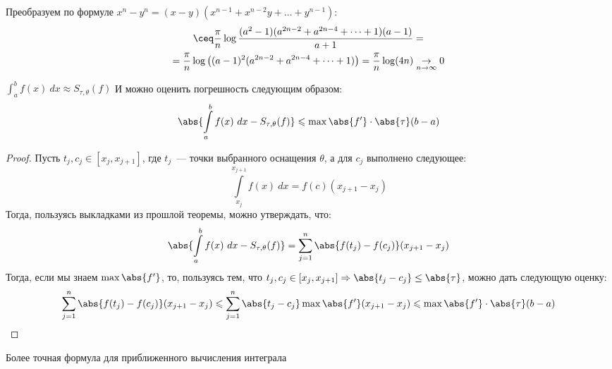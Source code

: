 \begin{example}
\begin{enumerate}
\begin{itemize}
\[            \] 
            Преобразуем по формуле $x^n - y^n = (x - y)(x^{n - 1} + x^{n - 2}y + \dots + y^{n - 1})$:
            \[
                \begin{gathered}
                    \ceq \frac{\pi}{n}\log\frac{(a^2-1)(a^{2n - 2}+a^{2n - 4} + \dots + 1)(a-1)}{a+1}=\\=
                    \frac{\pi}{n}\log\left((a-1)^2(a^{2n - 2}+a^{2n - 4} + \dots + 1)\right) = \frac{\pi}{n}\log(4n)
                    \underset{n\to\infty}{\to} 0
                \end{gathered}
            \] 
    \end{itemize}
    \end{enumerate}
    
\end{example}


\begin{remark}
    $\int_a^b f(x)\ dx \approx S_{\tau, \theta}(f)$
    И можно оценить погрешность следующим образом:
     \[
        \abs{\int\limits_{a}^{b}{f(x)\ dx} - S_{\tau, \theta}(f)} \leqslant \max{\abs{f'}} \cdot \abs{\tau} (b - a) 
    \] 
\end{remark}
\begin{proof}
    Пусть $t_j, c_j \in [x_j, x_{j + 1}]$, где $t_j$~--- точки выбранного оснащения $\theta$, а для $c_j$ выполнено следующее:
    \[
        \int\limits_{x_j}^{x_{j + 1}}{f(x)\ dx} = f(c) (x_{j + 1} - x_j)
    \]
    Тогда, пользуясь выкладками из прошлой теоремы, можно утверждать, что:
     \[
        \abs{\int\limits_{a}^{b}{f(x)\ dx} - S_{\tau, \theta}(f)} =
        \sum\limits_{j = 1}^{n} \abs{f(t_j) - f(c_j)}(x_{j + 1} - x_j) 
    \] 
    Тогда, если мы знаем $\max{\abs{f'}}$, то, пользуясь тем, что $t_j, c_j \in [x_j, x_{j + 1}] \Rightarrow \abs{t_j - c_j} \le \abs{\tau}$,
    можно дать следующую оценку:
    \[
        \begin{gathered}
            \sum\limits_{j = 1}^{n} \abs{f(t_j) - f(c_j)}(x_{j + 1} - x_j) \leqslant 
            \sum\limits_{j = 1}^{n} \abs{t_j - c_j} \max{\abs{f'}}(x_{j + 1} - x_j) \leqslant 
            \max{\abs{f'}} \cdot \abs{\tau} (b - a) 
        \end{gathered}
    \]
\end{proof} 
\quad 

\begin{remark}
    Более точная формула для приближенного вычисления интеграла
\end{remark}


 
